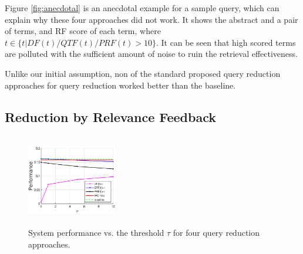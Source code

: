 Figure \ref{fig:anecdotal} is an anecdotal example for a sample query, which can explain why these four approaches did not work. It shows the abstract and a pair of terms, and RF score of each term, where $t \in \{t| DF(t)/QTF(t)/PRF(t)>10\} $. It can be seen that high scored terms are polluted with the sufficient amount of noise to ruin the retrieval effectiveness.   

Unlike our initial assumption, non of the standard proposed query reduction approaches for query reduction worked better than the baseline.
\subsection{Reduction by Relevance Feedback}
\begin{figure}
   \centering
   \includegraphics[width=0.35\textwidth,height=40mm]{figs/queryreduc-ipc-base.eps}
   \caption{System performance vs. the threshold $\tau$ for four query reduction approaches.}   
   \label{fig:queryreduc} 
\end{figure}


